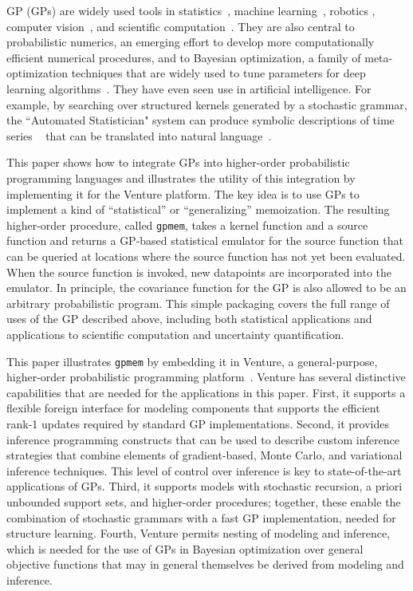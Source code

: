\acl{GP} (GPs)  are widely used tools in statistics~\citep{barry1986nonparametric}, machine learning~\citep{neal1995bayesian,williams1998bayesian,kuss2005assessing,rasmussen2006gaussian,damianou2013deep}, robotics \citep{ferris2006gaussian}, computer vision~\citep{kemmler2013one}, and scientific computation~\citep{kennedy2001bayesian,schneider2008simulations,kwan2013cosmic}.
They are also central to probabilistic numerics, an emerging effort to develop more computationally efficient numerical procedures, and to Bayesian optimization, a family of meta-optimization techniques that are widely used to tune parameters for deep learning algorithms~\citep{snoek2012practical,gelbart2014bayesian}. 
They have even seen use in artificial intelligence. For example, by searching
over structured kernels generated by a stochastic grammar, the ``Automated
Statistician" system can produce symbolic descriptions of time series
~\citep{duvenaud2013structure} that can be translated into natural
language~\citep{lloyd2014automatic}.



This paper shows how to integrate \acsp{GP} into higher-order
probabilistic programming languages and illustrates the utility of this
integration by implementing it for the Venture platform. The key idea is to use
GPs to implement a kind of “statistical” or “generalizing” memoization. The
resulting higher-order procedure, called {\tt gpmem}, takes a kernel function
and a source function and returns a GP-based statistical emulator for the source
function that can be queried at locations where the source function has not yet
been evaluated. When the source function is invoked, new datapoints are
incorporated into the emulator. In principle, the covariance function for the
GP is also allowed to be an arbitrary probabilistic program. This simple packaging covers the full range of uses of the GP described above, including both statistical applications and applications to scientific computation and uncertainty quantification.

This paper illustrates {\tt gpmem} by embedding it in Venture, a general-purpose, higher-order probabilistic programming platform~\citep{mansinghka2014venture}. Venture has several distinctive capabilities that are needed for the applications in this paper. First, it supports a flexible foreign interface for modeling components that supports the efficient rank-1 updates required by standard GP implementations. Second, it provides inference programming constructs that can be used to describe custom inference strategies that combine elements of gradient-based, Monte Carlo, and variational inference techniques. This level of control over inference is key to state-of-the-art applications of GPs. Third, it supports models with stochastic recursion, a priori unbounded support sets, and higher-order procedures; together, these enable the combination of stochastic grammars with a fast GP implementation, needed for structure learning. Fourth, Venture permits nesting of modeling and inference, which is needed for the use of GPs in Bayesian optimization over general objective functions that may in general themselves be derived from modeling and inference.

